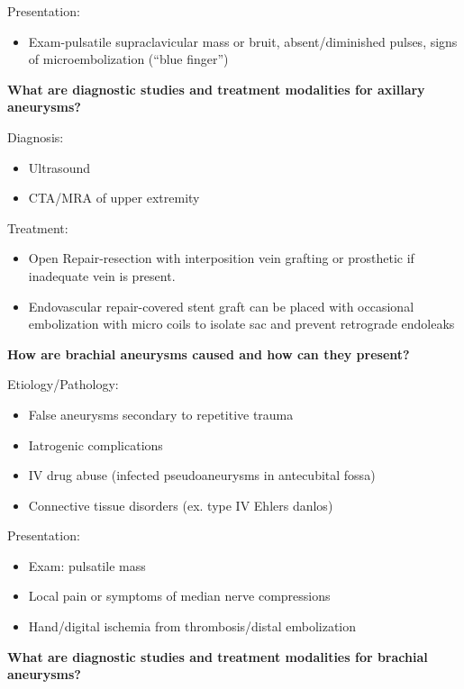 \documentclass[
]{book}
\providecommand{\tightlist}{%
  \setlength{\itemsep}{0pt}\setlength{\parskip}{0pt}}
\begin{document}
Presentation:~

\begin{itemize}
\tightlist
\item
  Exam-pulsatile supraclavicular mass or bruit, absent/diminished
  pulses, signs of microembolization (``blue finger'')
\end{itemize}

\textbf{What are diagnostic studies and treatment modalities for axillary
aneurysms?}

Diagnosis:~

\begin{itemize}
\item
  Ultrasound
\item
  CTA/MRA of upper extremity
\end{itemize}

Treatment:~

\begin{itemize}
\item
  Open Repair-resection with interposition vein grafting or prosthetic
  if inadequate vein is present.~
\item
  Endovascular repair-covered stent graft can be placed with
  occasional embolization with micro coils to isolate sac and prevent
  retrograde endoleaks
\end{itemize}

\textbf{How are brachial aneurysms caused and how can they present?}

Etiology/Pathology:~

\begin{itemize}
\item
  False aneurysms secondary to repetitive trauma
\item
  Iatrogenic complications~
\item
  IV drug abuse (infected pseudoaneurysms in antecubital fossa)~
\item
  Connective tissue disorders (ex. type IV Ehlers danlos)
\end{itemize}

Presentation:~

\begin{itemize}
\item
  Exam: pulsatile mass~
\item
  Local pain or symptoms of median nerve compressions
\item
  Hand/digital ischemia from thrombosis/distal embolization
\end{itemize}

\textbf{What are diagnostic studies and treatment modalities for brachial
aneurysms?}
\end{document}
